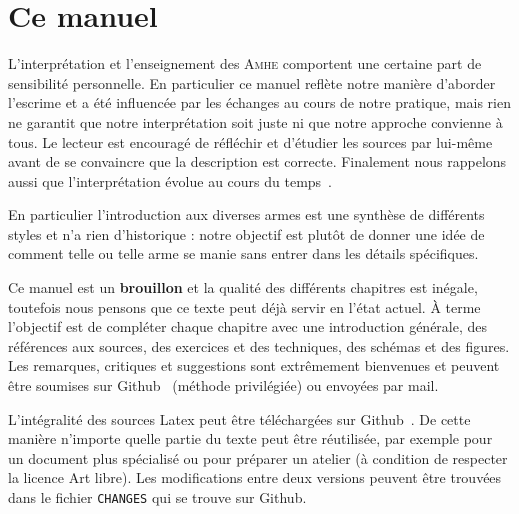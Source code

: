 \section{Ce manuel}


L'interprétation et l'enseignement des \textsc{Amhe} comportent une certaine part de sensibilité personnelle.
En particulier ce manuel reflète notre manière d'aborder l'escrime et a été influencée par les échanges au cours de notre pratique, mais rien ne garantit que notre interprétation soit juste ni que notre approche convienne à tous.
Le lecteur est encouragé de réfléchir et d'étudier les sources par lui-même avant de se convaincre que la description est correcte.
Finalement nous rappelons aussi que l'interprétation évolue au cours du temps~\footnotemark{}.

En particulier l'introduction aux diverses armes est une synthèse de différents styles et n'a rien d'historique : notre objectif est plutôt de donner une idée de comment telle ou telle arme se manie sans entrer dans les détails spécifiques.

Ce manuel est un \textbf{brouillon} et la qualité des différents chapitres est inégale, toutefois nous pensons que ce texte peut déjà servir en l'état actuel.
À terme l'objectif est de compléter chaque chapitre avec une introduction générale, des références aux sources, des exercices et des techniques, des schémas et des figures.
Les remarques, critiques et suggestions sont extrêmement bienvenues et peuvent être soumises sur Github~\footnotemark{} (méthode privilégiée) ou envoyées par mail.

L'intégralité des sources Latex peut être téléchargées sur Github~\footnotemark{}.
De cette manière n'importe quelle partie du texte peut être réutilisée, par exemple pour un document plus spécialisé ou pour préparer un atelier (à condition de respecter la licence Art libre).
Les modifications entre deux versions peuvent être trouvées dans le fichier \texttt{CHANGES} qui se trouve sur Github.



